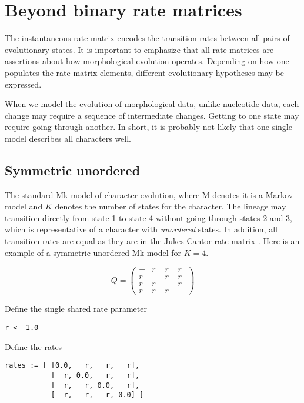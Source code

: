 \section{Beyond binary rate matrices} \label{sec:dm_matrix}

The instantaneous rate matrix encodes the transition rates between all pairs of evolutionary states.
It is important to emphasize that all rate matrices are assertions about how morphological evolution operates.
Depending on how one populates the rate matrix elements, different evolutionary hypotheses may be expressed. \par

When we model the evolution of morphological data, unlike nucleotide data, each change may require a sequence of intermediate changes.
Getting to one state may require going through another.
In short, it is probably not likely that one single model describes all characters well. \par 


\subsection{Symmetric unordered}

The standard Mk model of character evolution, where M denotes it is a Markov model and $K$ denotes the number of states for the character.
The lineage may transition directly from state 1 to state 4 without going through states 2 and 3, which is representative of a character with {\it unordered} states.
In addition, all transition rates are equal as they are in the Jukes-Cantor rate matrix \citep{jukes69}.
Here is an example of a symmetric unordered Mk model for $K=4$.

\begin{equation*}
Q = \begin{pmatrix}
- & r & r & r \\
r & - & r & r \\
r & r & - & r \\
r & r & r & - 
\end{pmatrix}
\end{equation*}


Define the single shared rate parameter
{\tt \begin{snugshade*}
\begin{lstlisting}
r <- 1.0
\end{lstlisting}
\end{snugshade*}}

Define the rates
{\tt \begin{snugshade*}
\begin{lstlisting}
rates := [ [0.0,   r,   r,   r],
           [  r, 0.0,   r,   r],
           [  r,   r, 0.0,   r],
           [  r,   r,   r, 0.0] ]
\end{lstlisting}
\end{snugshade*}}


